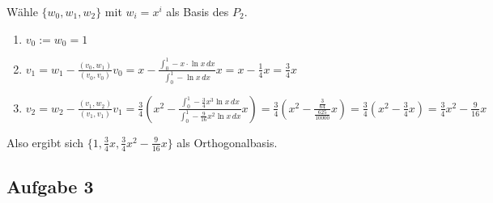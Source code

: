 \documentclass[11pt,a4paper,ngerman]{article}
\begin{document}
Wähle $\{w_0, w_1, w_2\}$ mit $w_i = x^i$ als Basis des $P_2$.
\begin{enumerate}
\item $v_0 := w_0 = 1$ 
\item $v_1 = w_1 - \frac{(v_0,w_1)}{(v_0,v_0)} v_0 = x - \frac{\int_0^1 - x \cdot \ln x \, dx}{\int_0^1 - \ln x \, dx} x
           = x - \frac{1}{4} x = \frac{3}{4}x$
\item $v_2 = w_2 - \frac{(v_1,w_2)}{(v_1,v_1)} v_1
           = \frac{3}{4} \left( x^2 - \frac{\int_0^1 - \frac{3}{4}x^3 \ln x \, dx }{ \int_0^1 - \frac{9}{16}x^2\ln x \, dx} x \right)
           = \frac{3}{4} \left(x^2 - \frac{\frac{3}{64}}{\frac{625}{10000}} x\right)
           = \frac{3}{4} \left(x^2 - \frac{3}{4} x\right) = \frac{3}{4}x^2 - \frac{9}{16}x$
\end{enumerate}

Also ergibt sich $\{1,\frac{3}{4}x,\frac{3}{4}x^2 - \frac{9}{16}x \}$ als Orthogonalbasis.
\subsection*{Aufgabe 3}



\label{LastPage}
\end{document}
